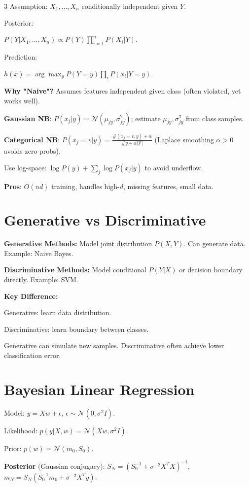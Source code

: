 \documentclass[8pt,fleqn]{extarticle}
\begin{document}
\begin{multicols}{3}
Assumption:
$X_1,\dots,X_n$ conditionally independent given $Y$.

Posterior:

$P(Y|X_1,\dots,X_n)
\propto
P(Y)\prod_{i=1}^n P(X_i|Y)$.

Prediction:

$h(x)=\arg\max_y P(Y=y)\prod_i P(x_i|Y=y)$.

\textbf{Why "Naive"?} Assumes features independent given class (often violated, yet works well).

\textbf{Gaussian NB}: $P(x_j|y)=\mathcal N(\mu_{jy},\sigma_{jy}^2)$; estimate $\mu_{jy},\sigma_{jy}^2$ from class samples.

\textbf{Categorical NB}: $P(x_j=v|y)=\frac{\#(x_j=v,y)+\alpha}{\#y+\alpha|\mathcal V|}$ (Laplace smoothing $\alpha>0$ avoids zero probs).

Use log-space: $\log P(y)+\sum_j\log P(x_j|y)$ to avoid underflow.

\textbf{Pros}: $O(nd)$ training, handles high-$d$, missing features, small data.


\section*{Generative vs Discriminative}

\textbf{Generative Methods:}
Model joint distribution $P(X,Y)$.
Can generate data.
Example: Naive Bayes.

\textbf{Discriminative Methods:}
Model conditional $P(Y|X)$
or decision boundary directly.
Example: SVM.

\textbf{Key Difference:}

Generative:
learn data distribution.

Discriminative:
learn boundary between classes.

Generative can simulate new samples.
Discriminative often achieve lower classification error.


\section*{Bayesian Linear Regression}

Model: $y=Xw+\epsilon$, $\epsilon\sim\mathcal N(0,\sigma^2 I)$.

Likelihood: $p(y|X,w)=\mathcal N(Xw,\sigma^2 I)$.

Prior: $p(w)=\mathcal N(m_0,S_0)$.

\textbf{Posterior} (Gaussian conjugacy):
$S_N=\!\left(S_0^{-1}+\sigma^{-2}X^TX\right)^{-1}$,\quad $m_N=S_N\!\left(S_0^{-1}m_0+\sigma^{-2}X^Ty\right)$.


\end{multicols}
\end{document}
